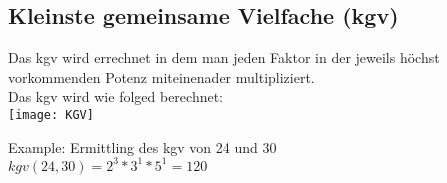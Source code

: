 \subsection{Kleinste gemeinsame Vielfache (kgv)}

\hfill \break
Das kgv wird errechnet in dem man jeden Faktor in der jeweils höchst vorkommenden Potenz miteinenader multipliziert.\\

\hfill \break
Das kgv wird wie folged berechnet:\\
\texttt{[image: KGV]}

\hfill \break
Example: Ermittling des kgv von 24 und 30\\
\fboxrule=0.8pt 
$kgv(24,30) = 2^3*3^1*5^1 =120$